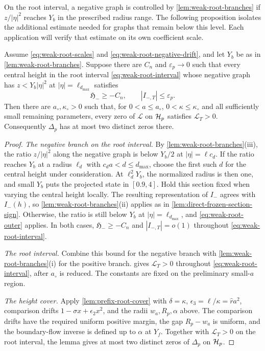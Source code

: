 On the root interval, a negative graph is controlled by
\cref{lem:weak-root-branches} if \(z/|\eta|^2\) reaches \(Y_b\) in the
prescribed radius range. The following proposition isolates the
additional estimate needed for graphs that remain below this level.
Each application will verify that estimate on its own coefficient
scale.

\begin{proposition}
\label{prop:weak-root-passage}
Assume \eqref{eq:weak-root-scales} and \eqref{eq:weak-root-negative-drift},
and let \(Y_b\) be as in \cref{lem:weak-root-branches}. Suppose there are
\(C_n\) and \(\varepsilon_p\to0\) such that every central height in the
root interval \eqref{eq:weak-root-interval} whose negative graph has
\(z<Y_b|\eta|^2\) at \(|\eta|=\ell_{d_{\max}}\) satisfies
\begin{equation}
\label{eq:weak-root-outer}
 \mathfrak H_-\ge-C_n,\qquad |I_{-,T}|\le\varepsilon_p .
\end{equation}
Then there are \(a_\circ,\kappa_\circ>0\) such that, for \(0<a\le a_\circ\),
\(0<\kappa\le\kappa_\circ\) and all sufficiently small remaining parameters,
every zero of \(\mathcal L\) on \(\mathcal H_p\) satisfies
\(\mathcal L_T>0\). Consequently \(\Delta_p\) has at most two distinct
zeros there.
\end{proposition}

\begin{proof}
\emph{The negative branch on the root interval.} By
\cref{lem:weak-root-branches}(iii), the ratio \(z/|\eta|^2\) along the
negative graph is below \(Y_b/2\) at \(|\eta|=\ell c_d\).
If the ratio reaches \(Y_b\) at a
radius \(\ell_d\) with \(c_da<d\le d_{\max}\), choose the first
such \(d\) for the central height under consideration. At
\(\ell_d^2Y_b\), the normalized radius is then one, and small
\(Y_b\) puts the projected state in \([0.9,4]\). Hold this section
fixed when varying the central height locally. The resulting
representation of \(I_-\) agrees with \(I_-(h)\), so
\cref{lem:weak-root-branches}(ii) applies as in
\cref{lem:direct-frozen-section-sign}. Otherwise, the ratio is still
below \(Y_b\) at \(|\eta|=\ell_{d_{\max}}\), and
\eqref{eq:weak-root-outer} applies. In both cases,
\(\mathfrak H_-\ge-C_n\) and \(|I_{-,T}|=o(1)\) throughout
\eqref{eq:weak-root-interval}.

\emph{The root interval.} Combine this bound for the negative branch
with \cref{lem:weak-root-branches}(i) for the positive branch.
 gives \(\mathcal L_T>0\)
throughout \eqref{eq:weak-root-interval}, after \(a_\circ\) is reduced.
The constants are fixed on the preliminary small-\(a\) region.

\emph{The height cover.} Apply \cref{lem:prefix-root-cover} with
\(\delta=\kappa\), \(\epsilon_3=\ell/\kappa=\hat ra^2\), comparison drifts
\(1-\sigma x+\epsilon_2x^2\), and the radii \(w_a,R_p,\alpha\) above.
The comparison drifts have the required uniform positive margin, the
gap \(R_p-w_a\) is uniform, and the boundary-flow inverse is defined
up to \(\alpha\) at \(Y_f\). Together with \(\mathcal L_T>0\) on
the root interval, the lemma gives at most two distinct zeros of
\(\Delta_p\) on \(\mathcal H_p\).
\end{proof}
